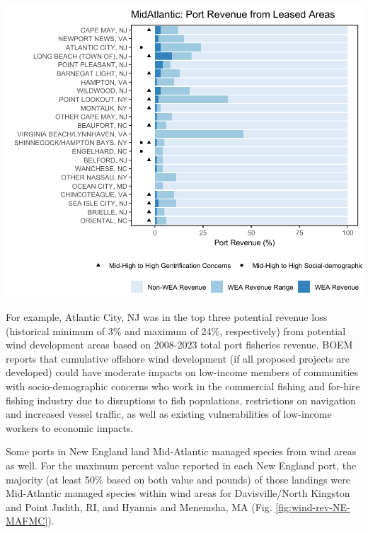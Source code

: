 \documentclass[
  10pt,
]{article}
\let\origfigure\figure
\let\endorigfigure\endfigure
\renewenvironment{figure}[1][2] {
    \expandafter\origfigure\expandafter[H]
} {
    \endorigfigure
}
\begin{document}
\begin{figure}

\includegraphics{midatlantic_files/figure-latex/wea-port-rev-1} \hfill{}

\caption{Percent of Mid-Atlantic port revenue from Wind Energy Areas (WEA) in descending order from most to least port revenue from WEA.}\label{fig:wea-port-rev}
\end{figure}

For example, Atlantic City, NJ was in the top three potential revenue loss (historical minimum of 3\% and maximum of 24\%, respectively) from potential wind development areas based on 2008-2023 total port fisheries revenue. BOEM reports that cumulative offshore wind development (if all proposed projects are developed) could have moderate impacts on low-income members of communities with socio-demographic concerns who work in the commercial fishing and for-hire fishing industry due to disruptions to fish populations, restrictions on navigation and increased vessel traffic, as well as existing vulnerabilities of low-income workers to economic impacts.

Some ports in New England land Mid-Atlantic managed species from wind areas as well. For the maximum percent value reported in each New England port, the majority (at least 50\% based on both value and pounds) of those landings were Mid-Atlantic managed species within wind areas for Davisville/North Kingston and Point Judith, RI, and Hyannis and Menemsha, MA (Fig. \ref{fig:wind-rev-NE-MAFMC}).
\end{document}
